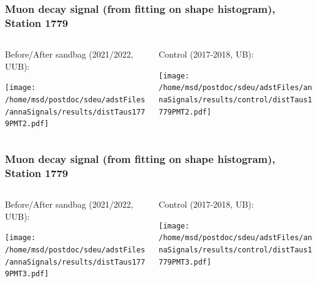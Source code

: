 \documentclass[aspectratio=169]{beamer}
\begin{document}
\begin{frame}
  \frametitle{Muon decay signal (from fitting on shape histogram), Station 1779}
  
  \begin{columns}[T,c]
    \begin{column}{.5\textwidth}
      Before/After sandbag (2021/2022, UUB):
      \vspace{.3cm}

      \texttt{[image: /home/msd/postdoc/sdeu/adstFiles/annaSignals/results/distTaus1779PMT2.pdf]}
    \end{column}
    \begin{column}{.5\textwidth}
      Control (2017-2018, UB):
      \vspace{0.3cm}

      \texttt{[image: /home/msd/postdoc/sdeu/adstFiles/annaSignals/results/control/distTaus1779PMT2.pdf]}
    \end{column}    
\end{columns}
\end{frame}

\begin{frame}
  \frametitle{Muon decay signal (from fitting on shape histogram), Station 1779}
  
  \begin{columns}[T,c]
    \begin{column}{.5\textwidth}
      Before/After sandbag (2021/2022, UUB):
      \vspace{.3cm}

      \texttt{[image: /home/msd/postdoc/sdeu/adstFiles/annaSignals/results/distTaus1779PMT3.pdf]}
    \end{column}
    \begin{column}{.5\textwidth}
      Control (2017-2018, UB):
      \vspace{0.3cm}

      \texttt{[image: /home/msd/postdoc/sdeu/adstFiles/annaSignals/results/control/distTaus1779PMT3.pdf]}
    \end{column}    
\end{columns}
\end{frame}
\end{document}
